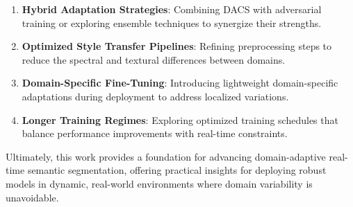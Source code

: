 \documentclass{article}
\begin{document}
\begin{multicols}{2}
		\begin{enumerate}
			\item \textbf {Hybrid Adaptation Strategies}: Combining DACS with adversarial training or exploring ensemble techniques to synergize their strengths.
			\item \textbf {Optimized Style Transfer Pipelines}: Refining preprocessing steps to reduce the spectral and textural differences between domains.
			\item \textbf {Domain-Specific Fine-Tuning}: Introducing lightweight domain-specific adaptations during deployment to address localized variations.
			\item \textbf {Longer Training Regimes}: Exploring optimized training schedules that balance performance improvements with real-time constraints.
		\end{enumerate}
		
		Ultimately, this work provides a foundation for advancing domain-adaptive real-time semantic segmentation, offering practical insights for deploying robust models in dynamic, real-world environments where domain variability is unavoidable.
		

		
	\end{multicols}
	
	
	
	
\end{document}
